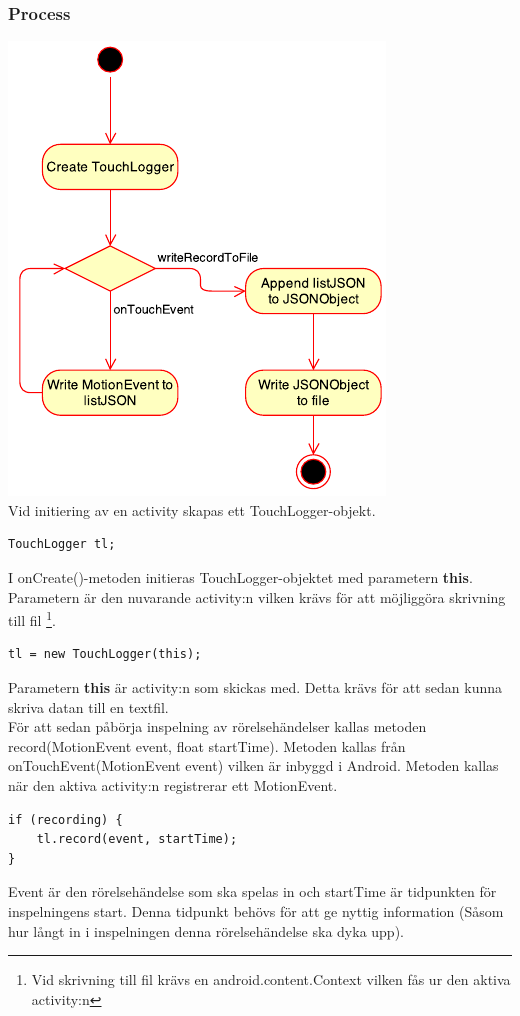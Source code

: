 \subsubsection{Process}
\includegraphics[scale=1.0]{TouchLoggerProcess.pdf} \\
Vid initiering av en activity skapas ett TouchLogger-objekt. 
\begin{verbatim}
TouchLogger tl;
\end{verbatim}
I onCreate()-metoden initieras TouchLogger-objektet med parametern \textbf{this}. Parametern är den nuvarande activity:n vilken krävs för att möjliggöra skrivning till fil \footnote{Vid skrivning till fil krävs en android.content.Context vilken fås ur den aktiva activity:n}.
\begin{verbatim}
tl = new TouchLogger(this);
\end{verbatim}
Parametern \textbf{this} är activity:n som skickas med. Detta krävs för att sedan kunna skriva datan till en textfil. \\
För att sedan påbörja inspelning av rörelsehändelser kallas metoden record(MotionEvent event, float startTime). Metoden kallas från onTouchEvent(MotionEvent event) vilken är inbyggd i Android. Metoden kallas när den aktiva activity:n registrerar ett MotionEvent. 
\begin{verbatim}
if (recording) {
    tl.record(event, startTime);
}
\end{verbatim}
Event är den rörelsehändelse som ska spelas in och startTime är tidpunkten för inspelningens start. Denna tidpunkt behövs för att ge nyttig information (Såsom hur långt in i inspelningen denna rörelsehändelse ska dyka upp).

